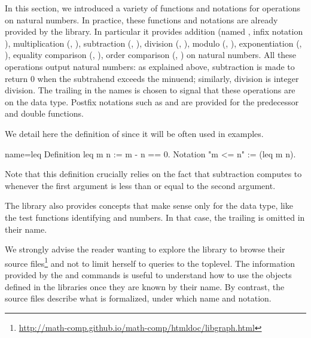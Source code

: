 

In this section, we introduced a variety of functions and notations
for operations on natural numbers.  In practice, these functions and
notations are already provided by the \mcbMC{} library.  In particular
it provides addition (named , infix notation \C{+}),
multiplication
(, \C{*}), subtraction (, \C{-}), division (,
\C{\%/}),  modulo (, \C{\%\%}), exponentiation (, \C{\^}),
equality comparison (, \C{==}), order
comparison (, \C{<=}) on natural numbers. All these operations
output natural numbers: as explained above, subtraction is made to
return \(0\) when the subtrahend exceeds the minuend; similarly,
division is integer division.  The trailing  in
the names is chosen to signal that these operations are on the  data
type.  Postfix notations such as  and  are provided for
the predecessor and double functions.

We detail here the definition of  since it will be often used
in examples.

\begin{coq}{name=leq}{}
Definition leq m n := m - n == 0.
Notation "m <= n" := (leq m n).
\end{coq}

Note that this definition crucially relies on the fact that
subtraction computes to  whenever the first argument is less than
or equal to the second argument.

The \mcbMC{} library also provides concepts that make sense only
for the  data type, like the
test functions identifying  and  numbers. In that
case, the trailing  is omitted in their name.

We strongly advise the reader wanting to explore the \mcbMC{} library
to browse their source
files\footnote{\url{http://math-comp.github.io/math-comp/htmldoc/libgraph.html}}
and not to limit herself to queries to the toplevel. The
information provided by the  and  commands is
useful to understand how to use the objects defined in the libraries
once they are known by their name. By contrast, the source
files describe what is formalized, under which name and notation.


